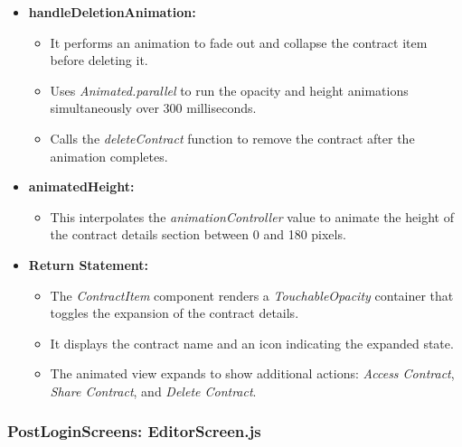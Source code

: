 \begin{itemize}
    \item \textbf{handleDeletionAnimation:}
    \begin{itemize}
        \item It performs an animation to fade out and collapse the contract item before deleting it.
        \item Uses \textit{Animated.parallel} to run the opacity and height animations simultaneously over 300 milliseconds.
        \item Calls the \textit{deleteContract} function to remove the contract after the animation completes.
    \end{itemize}

    \item \textbf{animatedHeight:}
    \begin{itemize}
        \item This interpolates the \textit{animationController} value to animate the height of the contract details section between 0 and 180 pixels.
    \end{itemize}

    \item \textbf{Return Statement:}
    \begin{itemize}
        \item The \textit{ContractItem} component renders a \textit{TouchableOpacity} container that toggles the expansion of the contract details.
        \item It displays the contract name and an icon indicating the expanded state.
        \item The animated view expands to show additional actions: \textit{Access Contract}, \textit{Share Contract}, and \textit{Delete Contract}.
    \end{itemize}
\end{itemize}

\subsubsection{PostLoginScreens: EditorScreen.js}

